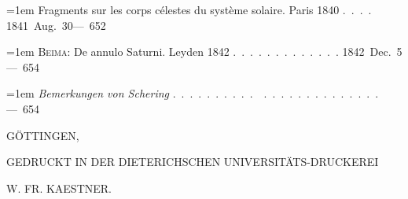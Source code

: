 \noindent\hangindent=1em Fragments sur les corps célestes du système solaire. Paris 1840 \mbox{.\ .\ .\ .} \hfill\mbox{1841 Aug. 30}\quad\mbox{--- 652}\par\smallskip
\noindent\hangindent=1em \textsc{Beima}: De annulo Saturni. Leyden 1842 \mbox{.\ .\ .\ .\ .\ .\ .\ .\ .\ .\ .\ .\ .} \hfill\mbox{1842 Dec. 5}\quad\mbox{--- 654}\par\smallskip
\noindent\hangindent=1em \emph{Bemerkungen von Schering} \mbox{.\ .\ .\ .\ .\ .\ .\ .\ .\ .\ \ .\ .\ .\ .\ .\ .\ .\ .\ .\ .\ .\ .\ .\ .} \hfill\mbox{}\quad\mbox{--- 654}\par\smallskip
\endgroup
\bigskip
\begin{center}
GÖTTINGEN,\par\medskip
{\small GEDRUCKT IN DER DIETERICHSCHEN UNIVERSITÄTS-DRUCKEREI}\par\smallskip
{\footnotesize W. FR. KAESTNER.}
\end{center}
